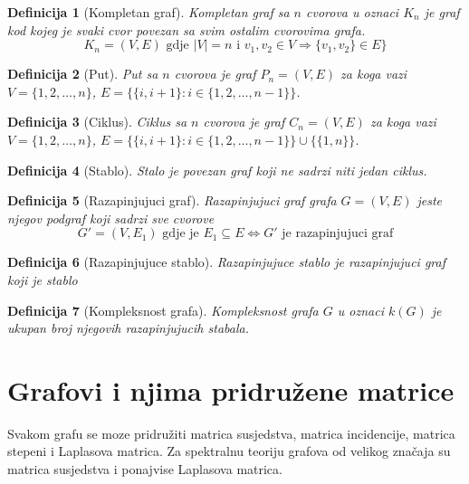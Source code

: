 \documentclass[11pt]{article}
\newtheorem{definition}{Definicija}
\begin{document}
		\begin{definition}[Kompletan graf]
		Kompletan graf sa $n$ cvorova u oznaci $K_n$ je graf kod kojeg je svaki cvor povezan sa svim ostalim cvorovima grafa. 
		\[ 
			K_n = (V,E) \text{ gdje } |V| = n \text{ i } v_1,v_2 \in V \Rightarrow \{v_1,v_2\} \in E\}
		\]
		\end{definition}
		
		\begin{definition}[Put]
		Put sa $n$ cvorova je graf $P_n=(V,E)$ za koga vazi $V = \{1,2, \dots ,n\}$, $E = \{\{i, i+1\} : i \in \{1,2, \dots , n-1\} \}$.
		\end{definition}
		
		\begin{definition}[Ciklus]
		Ciklus sa $n$ cvorova je graf $C_n=(V,E)$ za koga vazi $V = \{1,2, \dots ,n\}$, $E = \{\{i, i+1\} : i \in \{1,2, \dots , n-1\} \} \cup \{\{1,n\}\}$.
		\end{definition}
	
		\begin{definition}[Stablo]
		Stalo je povezan graf koji ne sadrzi niti jedan ciklus.
		\end{definition}
	
		\begin{definition}[Razapinjujuci graf]
		Razapinjujuci graf grafa $G = (V,E)$ jeste njegov podgraf koji sadrzi sve cvorove
		\[
			G' = (V, E_1) \text{ gdje je } E_1 \subseteq E \Leftrightarrow G' \text{ je razapinjujuci graf} 
		\]
		\end{definition}
	
		\begin{definition}[Razapinjujuce stablo]
		Razapinjujuce stablo je razapinjujuci graf koji je stablo
		\end{definition}
	
		\begin{definition}[Kompleksnost grafa]
		Kompleksnost grafa $G$ u oznaci $k(G)$ je ukupan broj njegovih razapinjujucih stabala. 
		\end{definition}
	
	\section{Grafovi i njima pridružene matrice}
	Svakom grafu se moze pridružiti matrica susjedstva, matrica incidencije, matrica stepeni i Laplasova matrica.
	Za spektralnu teoriju grafova od velikog značaja su matrica susjedstva i ponajvise Laplasova matrica.
	
\end{document}
